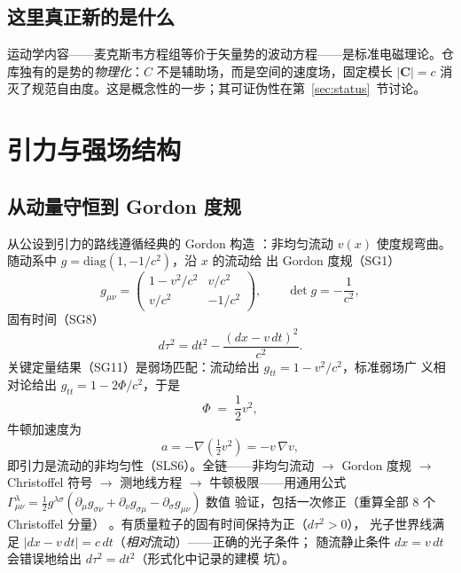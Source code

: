 \documentclass[aps,prd,preprint,superscriptaddress,amsmath,amssymb]{revtex4-2}
\begin{document}
\subsection{这里真正新的是什么}

运动学内容——麦克斯韦方程组等价于矢量势的波动方程——是标准电磁理论。仓
库独有的是势的\emph{物理化}：$C$ 不是辅助场，而是空间的速度场，固定模长
$|\bm{C}|=c$ 消灭了规范自由度。这是概念性的一步；其可证伪性在第~\ref{sec:status}~节讨论。

\section{引力与强场结构}\label{sec:gravity}

\subsection{从动量守恒到 Gordon 度规}

从公设到引力的路线遵循经典的 Gordon 构造 \cite{Gordon1923}：非均匀流动
$v(x)$ 使度规弯曲。随动系中 $g=\mathrm{diag}(1,-1/c^2)$，沿 $x$ 的流动给
出 Gordon 度规（SG1）
\begin{equation}
g_{\mu\nu} = \begin{pmatrix} 1-v^2/c^2 & v/c^2 \\ v/c^2 & -1/c^2 \end{pmatrix},
\qquad \det g = -\frac{1}{c^2} ,
\end{equation}
固有时间（SG8）
\begin{equation}
d\tau^2 = dt^2 - \frac{(dx-v\,dt)^2}{c^2} .
\end{equation}
关键定量结果（SG11）是弱场匹配：流动给出 $g_{tt}=1-v^2/c^2$，标准弱场广
义相对论给出 $g_{tt}=1-2\Phi/c^2$，于是
\begin{equation}
\Phi \;=\; \frac12 v^2 ,
\end{equation}
牛顿加速度为
\begin{equation}
a = -\nabla\left(\tfrac12 v^2\right) = -v\,\nabla v ,
\end{equation}
即引力是流动的非均匀性（SLS6）。全链——非均匀流动 $\to$ Gordon 度规 $\to$
Christoffel 符号 $\to$ 测地线方程 $\to$ 牛顿极限——用通用公式
$\Gamma^\lambda_{\mu\nu}=\frac12 g^{\lambda\sigma}(\partial_\mu
g_{\sigma\nu}+\partial_\nu g_{\sigma\mu}-\partial_\sigma g_{\mu\nu})$ 数值
验证，包括一次修正（重算全部 8 个 Christoffel 分量）
\cite{ProjectionPhysics-GR}。有质量粒子的固有时间保持为正（$d\tau^2>0$），
光子世界线满足 $|dx-v\,dt|=c\,dt$（\emph{相对}流动）——正确的光子条件；
随流静止条件 $dx=v\,dt$ 会错误地给出 $d\tau^2=dt^2$（形式化中记录的建模
坑）\cite{ProjectionPhysics-GR}。
\end{document}
